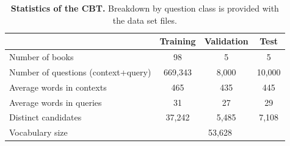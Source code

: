 \vspace{-2mm}
\begin{table}[ht]
\label{tab:cbt_stat}
  \begin{center}
    {\small 
      {\sc 
        \begin{tabular}{l|ccc}
          & Training & Validation & Test \\
          \hline
          \hline
          Number of books & 98 & 5 & 5 \\
          Number of questions (context+query)& 669,343 & 8,000 & 10,000  \\
          Average words in contexts & 465 & 435 & 445 \\
          Average words in queries & 31 & 27 & 29 \\
          Distinct candidates & 37,242 & 5,485 & 7,108 \\
          \hline
          Vocabulary size & \multicolumn{3}{|c}{53,628}\\
          \hline
        \end{tabular}
      }
    }
    \caption{\label{tab:cbt_stat} {\bf Statistics of the CBT.} Breakdown by question class is provided with the data set files.}
  \end{center}
\vspace*{-4ex}
\end{table}



